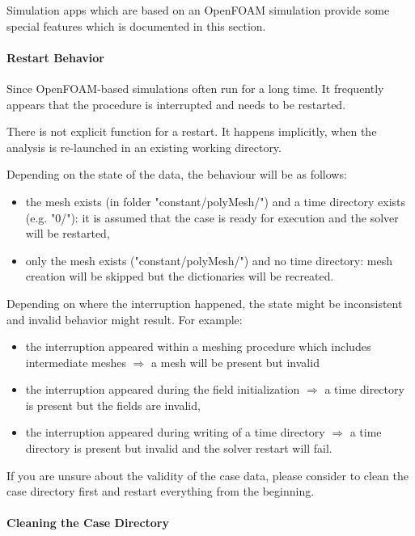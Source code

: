 Simulation apps which are based on an OpenFOAM simulation provide some special features which is documented in this section.

\paragraph{Restart Behavior}
Since OpenFOAM-based simulations often run for a long time. 
It frequently appears that the procedure is interrupted and needs to be restarted.

There is not explicit function for a restart.
It happens implicitly, when the analysis is re-launched in an existing working directory.

Depending on the state of the data, the behaviour will be as follows:
\begin{itemize}

\item the mesh exists (in folder "constant/polyMesh/") and a time directory exists (e.g. "0/"): it is assumed that the case is ready for execution and the solver will be restarted,

\item only the mesh exists ("constant/polyMesh/") and no time directory: mesh creation will be skipped but the dictionaries will be recreated.

\end{itemize}

Depending on where the interruption happened, the state might be inconsistent and invalid behavior might result.
For example:
\begin{itemize}
\item the interruption appeared within a meshing procedure which includes intermediate meshes $\Rightarrow$ a mesh will be present but invalid
\item the interruption appeared during the field initialization $\Rightarrow$ a time directory is present but the fields are invalid,
\item the interruption appeared during writing of a time directory $\Rightarrow$ a time directory is present but invalid and the solver restart will fail.
\end{itemize}

If you are unsure about the validity of the case data, please consider to clean the case directory first and restart everything from the beginning.

\paragraph{Cleaning the Case Directory}

